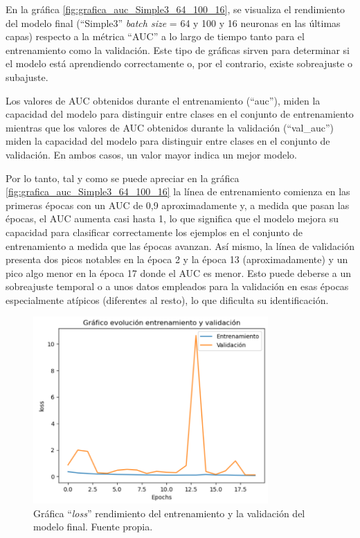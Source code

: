 En la gráfica \ref{fig:grafica_auc_Simple3_64_100_16}, se visualiza el rendimiento del modelo final (``Simple3'' \textit{batch size} = 64 y 100 y 16 neuronas en las últimas capas) respecto a la métrica ``AUC'' a lo largo de tiempo tanto para el entrenamiento como la validación. Este tipo de gráficas sirven para determinar si el modelo está aprendiendo correctamente o, por el contrario, existe sobreajuste o subajuste.

Los valores de AUC obtenidos durante el entrenamiento (``auc''), miden la capacidad del modelo para distinguir entre clases en el conjunto de entrenamiento mientras que los valores de AUC obtenidos durante la validación (``val\_auc'') miden la capacidad del modelo para distinguir entre clases en el conjunto de validación. En ambos casos, un valor mayor indica un mejor modelo.

Por lo tanto, tal y como se puede apreciar en la gráfica \ref{fig:grafica_auc_Simple3_64_100_16} la línea de entrenamiento comienza en las primeras épocas con un AUC de 0,9 aproximadamente y, a medida que pasan las épocas, el AUC aumenta casi hasta 1, lo que significa que el modelo mejora su capacidad para clasificar correctamente los ejemplos en el conjunto de entrenamiento a medida que las épocas avanzan. Así mismo, la línea de validación presenta dos picos notables en la época 2 y la época 13 (aproximadamente) y un pico algo menor en la época 17 donde el AUC es menor. Esto puede deberse a un sobreajuste temporal o a unos datos empleados para la validación en esas épocas especialmente atípicos (diferentes al resto), lo que dificulta su identificación.

\begin{figure}[h]
    \centering
    \includegraphics[width=0.80\textwidth]{img/grafica_loss_Simple3_64_100_16.PNG}
    \caption{Gráfica ``\textit{loss}'' rendimiento del entrenamiento y la validación del modelo final. Fuente propia.}
    \label{fig:grafica_loss_Simple3_64_100_16}
\end{figure}
\FloatBarrier

